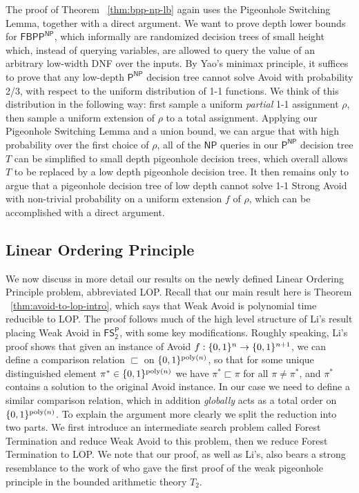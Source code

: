 The proof of Theorem ~\ref{thm:bpp-np-lb} again uses the Pigeonhole Switching Lemma, together with a direct argument. 
We want to prove depth lower bounds for $\mathsf{FBPP^{NP}}$, which informally are randomized decision trees of small height which, instead of querying variables, are allowed to query the value of an arbitrary low-width DNF over the inputs. 
By Yao's minimax principle, it suffices to prove that any low-depth $\mathsf{P^{NP}}$ decision tree cannot solve Avoid with probability 2/3, with respect to the uniform distribution of 1-1 functions. We think of this distribution in the following way: first sample a uniform \emph{partial} 1-1 assignment $\rho$, then sample a uniform extension of $\rho$ to a total assignment.
Applying our Pigeonhole Switching Lemma and a union bound, we can argue that with high probability over the first choice of $\rho$, all of the $\mathsf{NP}$ queries in our $\mathsf{P^{NP}}$ decision tree $T$ can be simplified to small depth pigeonhole decision trees, which overall allows $T$ to be replaced by a low depth pigeonhole decision tree. It then remains only to argue that a pigeonhole decision tree of low depth cannot solve 1-1 Strong Avoid with non-trivial probability on a uniform extension $f$ of $\rho$, which can be accomplished with a direct argument.

\subsection{Linear Ordering Principle}
 
We now discuss in more detail our results on the newly defined Linear Ordering Principle problem, abbreviated LOP. Recall that our main result here is Theorem ~\ref{thm:avoid-to-lop-intro}, which says that Weak Avoid is polynomial time reducible to LOP. The proof follows much of the high level structure of Li's result placing Weak Avoid in $\mathsf{FS_2^P}$, with some key modifications. Roughly speaking, Li's proof shows that given an instance of Avoid $f: \{0,1\}^n \to \{0,1\}^{n+1}$, we can define a comparison relation $\sqsubset$ on $\{0,1\}^{\mathrm{poly}(n)}$, so that for some unique distinguished element $\pi^* \in\{0,1\}^{\mathrm{poly}(n)}$ we have $\pi^* \sqsubset \pi$ for all $\pi \neq \pi^*$, and $\pi^*$ contains a solution to the original Avoid instance. In our case we need to define a similar comparison relation, which in addition \emph{globally} acts as a total order on $\{0,1\}^{\mathrm{poly}(n)}$. To explain the argument more clearly we split the reduction into two parts. We first introduce an intermediate search problem called Forest Termination and reduce Weak Avoid to this problem, then we reduce Forest Termination to LOP.
We note that our proof, as well as Li's, also bears a strong resemblance to the work of \cite{Paris-Wilkie-Woods} who gave the first proof of the weak pigeonhole principle in the bounded arithmetic theory $T_2$.%


